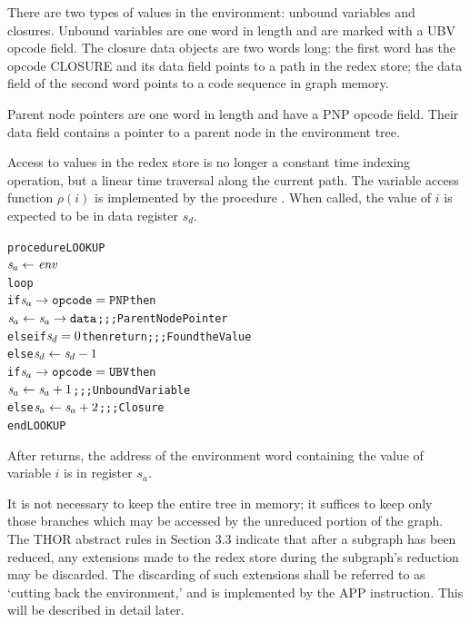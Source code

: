 There are two types of values in the environment: unbound variables and closures. Unbound variables are one word in length and are marked with a UBV opcode field. The closure data objects are two words long: the first word has the opcode CLOSURE and its data field points to a path in the redex store; the data field of the second word points to a code sequence in graph memory.

Parent node pointers are one word in length and have a PNP opcode field. Their data field contains a pointer to a parent node in the environment tree.

Access to values in the redex store is no longer a constant time indexing operation, but a linear time traversal along the current path. The variable access function \(\rho(i)\) is implemented by the procedure . When called, the value of \(i\) is expected to be in data register \(s_d\).

\par\smallskip\noindent\begin{minipage}{\linewidth}
\begin{alltt}
procedure LOOKUP
  \(\rtsa \leftarrow \rt{env}\)
  loop
    if \(\rtsa\rightarrow\mathtt{opcode} = \mathtt{PNP}\) then
      \(\rtsa \leftarrow \rtsa\rightarrow\mathtt{data}\)    \textrm{;;; Parent Node Pointer}
    else if \(\rtsd = 0\) then return  \textrm{;;; Found the Value}
    else \(\rtsd \leftarrow \rtsd-1\)
         if \(\rtsa\rightarrow\mathtt{opcode} = \mathtt{UBV}\) then
           \(\rtsa \leftarrow \rtsa+1\)         \textrm{;;; Unbound Variable}
         else \(\rtsa \leftarrow \rtsa+2\)      \textrm{;;; Closure}
end LOOKUP
\end{alltt}
\end{minipage}\par\smallskip



After  returns, the address of the environment word containing the value of variable \(i\) is in register \(s_a\).

It is not necessary to keep the entire tree in memory; it suffices to keep only those branches which may be accessed by the unreduced portion of the graph. The THOR abstract rules in Section 3.3 indicate that after a subgraph has been reduced, any extensions made to the redex store during the subgraph's reduction may be discarded. The discarding of such extensions shall be referred to as `cutting back the environment,' and is implemented by the APP instruction. This will be described in detail later.

